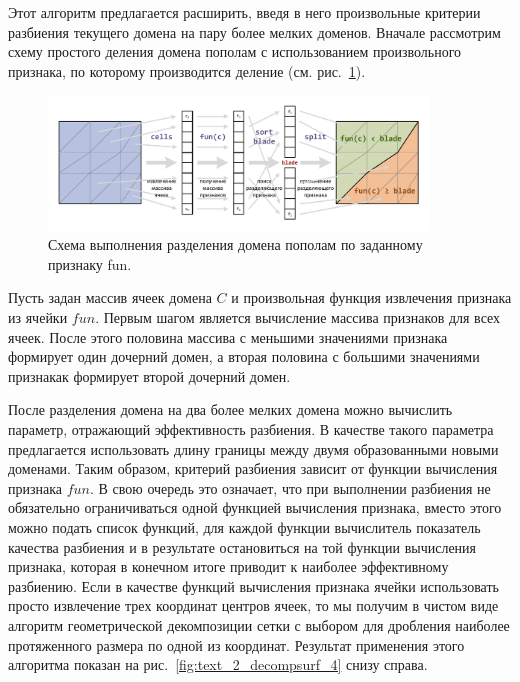 Этот алгоритм предлагается расширить, введя в него произвольные критерии разбиения текущего домена на пару более мелких доменов.
Вначале рассмотрим схему простого деления домена пополам с использованием произвольного признака, по которому производится деление (см. рис.~\ref{fig:text_2_decompsurf_split}).

\begin{figure}[ht]
\centering
\includegraphics[width=0.9\textwidth]{./pics/text_2_decompsurf/split.pdf}
\singlespacing
{}\caption{Схема выполнения разделения домена пополам по заданному признаку fun.}
\label{fig:text_2_decompsurf_split}
\end{figure}

Пусть задан массив ячеек домена $C$ и произвольная функция извлечения признака из ячейки $fun$.
Первым шагом является вычисление массива признаков для всех ячеек.
После этого половина массива с меньшими значениями признака формирует один дочерний домен, а вторая половина с большими значениями признакак формирует второй дочерний домен.

После разделения домена на два более мелких домена можно вычислить параметр, отражающий эффективность разбиения.
В качестве такого параметра предлагается использовать длину границы между двумя образованными новыми доменами.
Таким образом, критерий разбиения зависит от функции вычисления признака $fun$.
В свою очередь это означает, что при выполнении разбиения не обязательно ограничиваться одной функцией вычисления признака, вместо этого можно подать список функций, для каждой функции вычислитель показатель качества разбиения и в результате остановиться на той функции вычисления признака, которая в конечном итоге приводит к наиболее эффективному разбиению.
Если в качестве функций вычисления признака ячейки использовать просто извлечение трех координат центров ячеек, то мы получим в чистом виде алгоритм геометрической декомпозиции сетки с выбором для дробления наиболее протяженного размера по одной из координат.
Результат применения этого алгоритма показан на рис.~\ref{fig:text_2_decompsurf_4} снизу справа.

